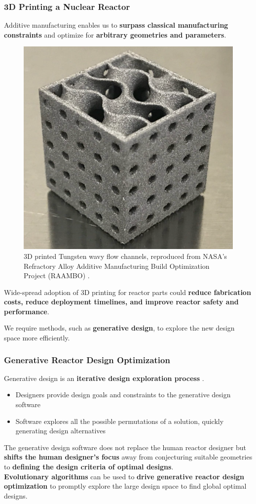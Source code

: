 \begin{frame}
    \frametitle{3D Printing a Nuclear Reactor}
    Additive manufacturing enables us to \textbf{surpass classical 
    manufacturing constraints} and optimize for \textbf{arbitrary geometries and 
    parameters}. 
    \begin{figure}[]
        \includegraphics[width=0.3\linewidth]{figures/tungsten-wavy-channels.png}
        \caption{3D printed Tungsten wavy flow channels, reproduced from NASA's Refractory 
        Alloy Additive Manufacturing Build Optimization Project (RAAMBO) 
        \cite{mireles_refractory_2022}.}
    \end{figure}
    \vspace{-0.2cm}
    Wide-spread adoption of 3D printing for reactor parts could \textbf{reduce 
    fabrication costs, reduce deployment timelines, and improve reactor safety and 
    performance}.

    \vspace{0.2cm}
    We require methods, such as \textbf{generative design}, to explore the 
    new design space more efficiently. 
\end{frame}

  \begin{frame}
    \frametitle{Generative Reactor Design Optimization}
    Generative design is an \textbf{iterative design exploration process} \cite{autodesk_autodesk_2020}. 
    \begin{itemize}
        \item Designers provide design goals and constraints to the generative design 
        software
        \item Software explores all the possible permutations of a solution, quickly generating 
        design alternatives
    \end{itemize}
    \vspace{0.2cm}
    The generative design software does not replace the human reactor designer but 
    \textbf{shifts the human designer's focus} away from conjecturing suitable geometries 
    to \textbf{defining the design criteria of optimal designs}. \\

    \textbf{Evolutionary algorithms} can be used to \textbf{drive generative reactor 
    design optimization} to promptly explore the large design space to find global optimal 
    designs. 
  \end{frame}

